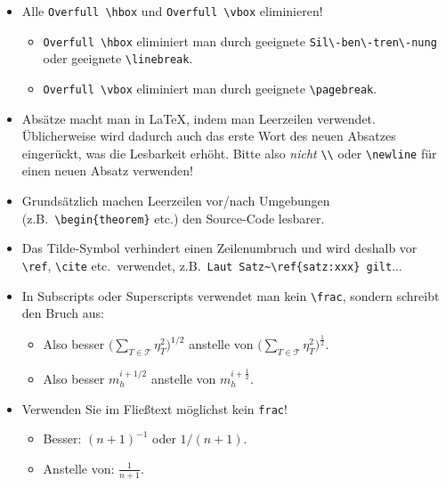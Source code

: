 \begin{itemize}

  \item Alle \verb$Overfull \hbox$ und \verb$Overfull \vbox$ eliminieren!
        \begin{itemize}
          \item \verb$Overfull \hbox$ eliminiert man durch geeignete \verb$Sil\-ben\-tren\-nung$ oder geeignete \verb$\linebreak$.
          \item \verb$Overfull \vbox$ eliminiert man durch geeignete \verb$\pagebreak$.
        \end{itemize}

  \item Absätze macht man in \LaTeX, indem man Leerzeilen verwendet. Üblicherweise wird dadurch auch das erste Wort des neuen Absatzes eingerückt, was die Lesbarkeit erhöht. Bitte also \emph{nicht} \verb$\\$ oder \verb$\newline$ für einen neuen Absatz verwenden!
  \item Grundsätzlich machen Leerzeilen vor/nach Umgebungen (z.B.\ \verb$\begin{theorem}$ etc.) den Source-Code lesbarer.
  \item Das Tilde-Symbol verhindert einen Zeilenumbruch und wird deshalb vor \verb$\ref$, \verb$\cite$ etc.\ verwendet, z.B.\ \verb$Laut Satz~\ref{satz:xxx} gilt$...

  \item In Subscripts oder Superscripts verwendet man kein \verb$\frac$, sondern schreibt den Bruch aus:
        \begin{itemize}
          \item Also besser $\displaystyle \bigg(\sum_{T \in \mathcal T} \eta_T^2\bigg)^{1/2}$ anstelle von
                $\displaystyle \bigg(\sum_{T \in \mathcal T} \eta_T^2\bigg)^{\frac{1}{2}}$.
          \item Also besser $m_h^{i+1/2}$ anstelle von $m_h^{i+\frac{1}{2}}$.
        \end{itemize}

  \item Verwenden Sie im Fließtext möglichst kein \verb$frac$!
        \begin{itemize}
          \item Besser: $(n+1)^{-1}$ oder $1/(n+1)$.
          \item Anstelle von: $\frac{1}{n+1}$.
        \end{itemize}


\end{itemize}
